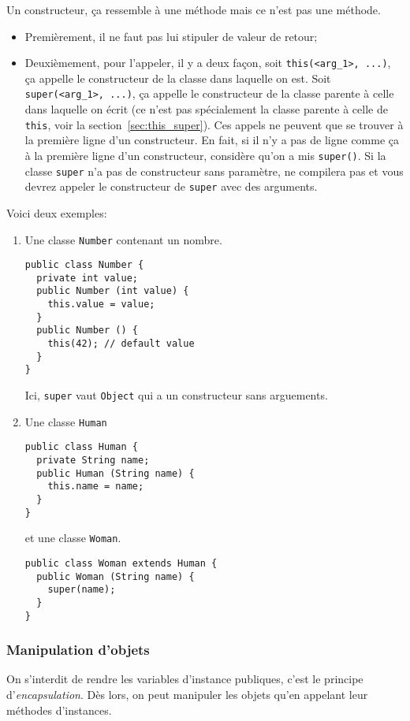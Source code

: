 Un constructeur, ça ressemble à une méthode mais ce n'est pas une méthode.
\begin{itemize}
  \item Premièrement, il ne faut pas lui stipuler de valeur de retour;
  \item
    Deuxièmement, pour l'appeler, il y a deux façon,
    soit \lstinline|this(<arg_1>, ...)|, ça appelle le constructeur
    de la classe dans laquelle on est.
    Soit \lstinline|super(<arg_1>, ...)|, ça appelle le constructeur
    de la classe parente à celle dans laquelle on écrit
    (ce n'est pas spécialement la classe parente à celle de \lstinline|this|,
    voir la section~\ref{sec:this_super}).
    Ces appels ne peuvent que se trouver à la première ligne d'un constructeur.
    En fait, si il n'y a pas de ligne comme ça à la première ligne
    d'un constructeur, \java{} considère qu'on a mis \lstinline|super()|.
    Si la classe \lstinline|super| n'a pas de constructeur sans paramètre,
    \java{} ne compilera pas et vous devrez appeler
    le constructeur de \lstinline|super| avec des arguments.
\end{itemize}

Voici deux exemples:
\begin{enumerate}
  \item
    Une classe \lstinline|Number| contenant un nombre.
    \begin{lstlisting}
public class Number {
  private int value;
  public Number (int value) {
    this.value = value;
  }
  public Number () {
    this(42); // default value
  }
}
    \end{lstlisting}
    Ici, \lstinline|super| vaut \lstinline|Object| qui a un constructeur
    sans arguements.
  \item
    Une classe \lstinline{Human}
    \begin{lstlisting}
public class Human {
  private String name;
  public Human (String name) {
    this.name = name;
  }
}
    \end{lstlisting}
    et une classe \lstinline{Woman}.
    \begin{lstlisting}
public class Woman extends Human {
  public Woman (String name) {
    super(name);
  }
}
    \end{lstlisting}
\end{enumerate}

\subsubsection{Manipulation d'objets}
On s'interdit de rendre les variables d'instance publiques,
c'est le principe d'\emph{encapsulation}.
Dès lors,
on peut manipuler les objets qu'en appelant leur méthodes d'instances.

